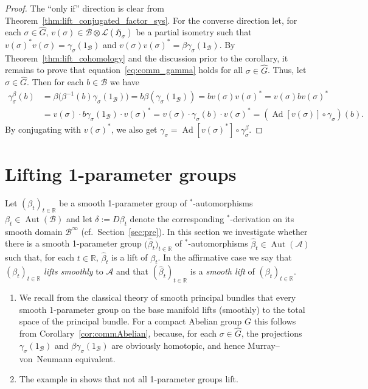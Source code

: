 \documentclass[pdftex]{sigma}
\numberwithin{equation}{section}
\newcommand*{\R}{\mathbb R}		%
\newcommand*{\tensor}{\otimes}		%
\DeclareMathOperator{\Ad}{Ad}		%
\DeclareMathOperator{\Aut}{Aut}
\newcommand*{\Star}{$^*$\nobreakdash}
\newcommand*{\hilb}{\mathfrak}		%
\newcommand*{\alg}{\mathcal}		%
\newcommand*{\hH}{\hilb{H}}			%
\newcommand*{\one}{1}				%
\newcommand*{\aA}{\alg{A}}			%
\newcommand*{\aB}{\alg{B}} 			%
\newcommand*{\End}{\mathcal{L}} %
\begin{document}
\begin{proof}
	The ``only if'' direction is clear from Theorem~\ref{thm:lift_conjugated_factor_sys}.
	For the converse direction let, for each $\sigma \in \hat G$, $v(\sigma) \in \aB \tensor \End(\hH_\sigma)$ be a partial isometry such that $v(\sigma)^* v(\sigma) = \gamma_\sigma(\one_\aB)$ and $v(\sigma) v(\sigma)^* = \beta\gamma_\sigma(\one_\aB)$.
	By Theorem~\ref{thm:lift_cohomology} and the discussion prior to the corollary, it remains to prove that equation~\eqref{eq:comm_gamma} holds for all $\sigma \in \hat G$.
	Thus, let $\sigma \in \hat G$.
	Then for each $b \in \aB$ we have
	\begin{align*}
		\gamma^\beta_\sigma(b)
		&=
		\beta\big( \beta^{-1}(b) \gamma_\sigma(\one_\aB) \big)
		= b \beta ( \gamma_\sigma(\one_\aB) )
		= b v(\sigma) v(\sigma)^*
		= v(\sigma) b v(\sigma)^*
		\\
		&=
		v(\sigma) \cdot b\gamma_\sigma(\one_\aB) \cdot v(\sigma)^*
		= v(\sigma) \cdot \gamma_\sigma(b) \cdot v(\sigma)^*
		= ( \Ad[v(\sigma)] \circ \gamma_\sigma ) (b).
	\end{align*}
	By conjugating with $v(\sigma)^*$, we also get $\gamma_\sigma = \Ad[v(\sigma)^*] \circ \gamma_\sigma^\beta$.
\end{proof}

\section{Lifting 1-parameter groups}\label{sec:1-para}

Let $(\beta_t)_{t \in \R}$ be a smooth 1-parameter group of \Star-automorphisms $\beta_t \in \Aut(\aB)$ and let $\delta := D\beta_t$ denote the corresponding \Star-derivation on its smooth domain $\aB^\infty$ (cf.\ Section~\ref{sec:pre}).
In this section we investigate whether there is a smooth 1-parameter group $\big(\hat\beta_t\big)_{t \in \R}$ of \Star-automorphisms $\hat\beta_t \in \Aut(\aA)$ such that, for each $t \in \R$, $\hat\beta_t$ is a lift of $\beta_t$.
In the affirmative case we say that $(\beta_t)_{t \in\R}$ \emph{lifts smoothly} to $\aA$ and that $(\hat\beta_t)_{t \in \R}$ is a \emph{smooth lift} of $(\beta_t)_{t \in \R}$.

\begin{Example}\quad
	\begin{enumerate}\itemsep=0pt
	\item
		We recall from the classical theory of smooth principal bundles that every smooth 1-pa\-ra\-me\-ter group on the base manifold lifts (smoothly) to the total space of the principal bundle.
		For a compact Abelian group $G$ this follows from Corollary~\ref{cor:commAbelian}, because, for each $\sigma \in \hat G$, the projections $\gamma_\sigma(\one_\aB)$ and $\beta\gamma_\sigma(\one_\aB)$ are obviously homotopic, and hence Murray--von~Neumann equivalent.
	\item
		The example in \cite[Section~4]{BCER84} shows that not all 1-parameter groups lift.
	\end{enumerate}
\end{Example}
\end{document}
